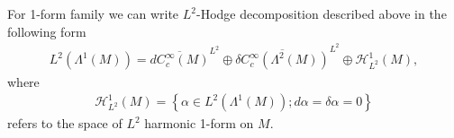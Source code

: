 \documentclass[12pt]{amsart}
\begin{document}















For 1-form family we can write  $L^2$-Hodge decomposition described above in the following form
\begin{align}
    L^2(\Lambda^1(M)) = \overline{d C_c^\infty(M)}^{L^2} \oplus \overline{\delta C_c^\infty(\Lambda^2(M))}^{L^2} \oplus \mathcal{H}_{L^2}^1(M),
\end{align}
where
\begin{align}
    \mathcal{H}_{L^2}^1(M) = \left\{ \alpha \in L^2(\Lambda^1(M)); d\alpha = \delta \alpha = 0   \right\}
\end{align}
refers to the space of $L^2$ harmonic 1-form on $M$.
\end{document}
